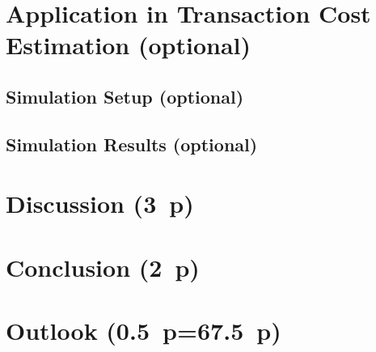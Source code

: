 \newpage
\section{Application in Transaction Cost Estimation (optional)}\label{sec:application}
\subsection{Simulation Setup (optional)}\label{sec:simulation-setup}
\subsection{Simulation Results (optional)}\label{sec:simulation-results}

\newpage
\section{Discussion (3~p)}\label{sec:discussion}

\newpage
\section{Conclusion (2~p)}\label{sec:conclusion}

\newpage
\section{Outlook (0.5~p=67.5~p)}\label{sec:outlook}

